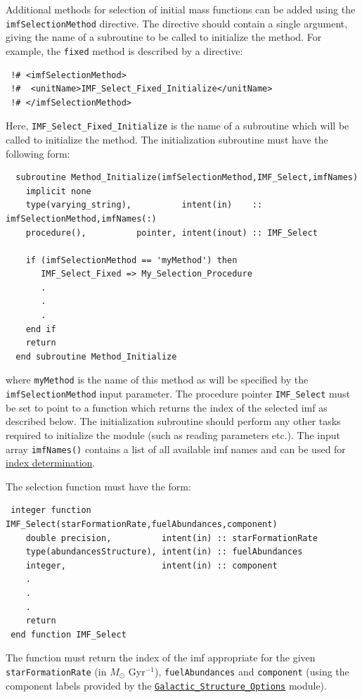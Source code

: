 Additional methods for selection of initial mass functions can be added using the {\tt imfSelectionMethod} directive. The directive should contain a single argument, giving the name of a subroutine to be called to initialize the method. For example, the {\tt fixed} method is described by a directive:
\begin{verbatim}
 !# <imfSelectionMethod>
 !#  <unitName>IMF_Select_Fixed_Initialize</unitName>
 !# </imfSelectionMethod>
\end{verbatim}
Here, {\tt IMF\_Select\_Fixed\_Initialize} is the name of a subroutine which will be called to initialize the method. The initialization subroutine must have the following form:
\begin{verbatim}
  subroutine Method_Initialize(imfSelectionMethod,IMF_Select,imfNames)
    implicit none
    type(varying_string),          intent(in)    :: imfSelectionMethod,imfNames(:)
    procedure(),          pointer, intent(inout) :: IMF_Select

    if (imfSelectionMethod == 'myMethod') then
       IMF_Select_Fixed => My_Selection_Procedure
       .
       .
       .
    end if
    return
  end subroutine Method_Initialize
\end{verbatim}
where {\tt myMethod} is the name of this method as will be specified by the {\tt imfSelectionMethod} input parameter. The procedure pointer {\tt IMF\_Select} must be set to point to a function which returns the index of the selected \gls{imf} as described below. The initialization subroutine should perform any other tasks required to initialize the module (such as reading parameters etc.). The input array {\tt imfNames()} contains a list of all available \gls{imf} names and can be used for \hyperlink{star_formation.IMF.utilities.F90:star_formation_imf_utilities:imf_index_lookup}{index determination}.

The selection function must have the form:
\begin{verbatim}
 integer function IMF_Select(starFormationRate,fuelAbundances,component)
    double precision,          intent(in) :: starFormationRate
    type(abundancesStructure), intent(in) :: fuelAbundances
    integer,                   intent(in) :: component
    .
    .
    .
    return
 end function IMF_Select
\end{verbatim}
The function must return the index of the \gls{imf} appropriate for the given {\tt starFormationRate} (in $M_\odot$ Gyr$^{-1}$), {\tt fuelAbundances} and {\tt component} (using the component labels provided by the \hyperlink{galactic_structure.options.F90:galactic_structure_options}{{\tt Galactic\_Structure\_Options}} module).

